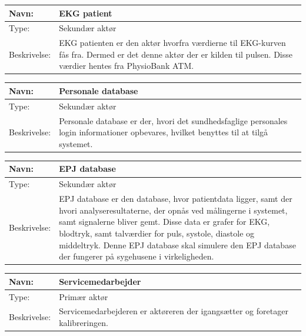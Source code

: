 \begin{table}[h!]
\begin{tabular}{| >{\raggedright\arraybackslash}p{3cm} | >{\raggedright\arraybackslash}p{12cm} |}
   \hline
   Navn: & EKG patient\\ \hline
   Type: & Sekundær aktør \\ \hline
   Beskrivelse: & EKG patienten er den aktør hvorfra værdierne til EKG-kurven fås fra. Dermed er det denne aktør der er kilden til pulsen. Disse værdier hentes fra PhysioBank ATM.\\ \hline
\end{tabular}
\end{table}
\begin{table}[h!]
\begin{tabular}{| >{\raggedright\arraybackslash}p{3cm} | >{\raggedright\arraybackslash}p{12cm} |}
   \hline
   Navn: & Personale database\\ \hline
   Type: & Sekundær aktør \\ \hline
   Beskrivelse: & Personale database er der, hvori det sundhedsfaglige personales login informationer opbevares, hvilket benyttes til at tilgå systemet. \\ \hline
\end{tabular}
\end{table}
\begin{table}[h!]
\begin{tabular}{| >{\raggedright\arraybackslash}p{3cm} | >{\raggedright\arraybackslash}p{12cm} |}
   \hline
   Navn: & EPJ database\\ \hline
   Type: & Sekundær aktør \\ \hline
   Beskrivelse: & EPJ database er den database, hvor patientdata ligger, samt der hvori analyseresultaterne, der opnås ved målingerne i systemet, samt signalerne bliver gemt. Disse data er grafer for EKG, blodtryk, samt talværdier for puls, systole, diastole og middeltryk. Denne EPJ database skal simulere den EPJ database der fungerer på sygehusene i virkeligheden.\\ \hline
\end{tabular}
\end{table}
\begin{table}[h!]
\begin{tabular}{| >{\raggedright\arraybackslash}p{3cm} | >{\raggedright\arraybackslash}p{12cm} |}
   \hline
   Navn: & Servicemedarbejder\\ \hline
   Type: & Primær aktør \\ \hline
   Beskrivelse: & Servicemedarbejderen er aktøreren der igangsætter og foretager kalibreringen.\\ \hline
\end{tabular}
\end{table}
\newpage
